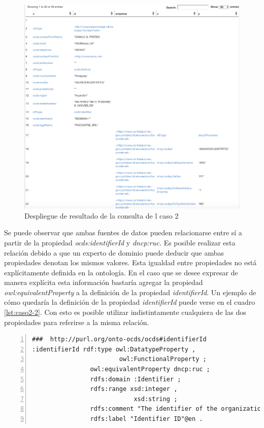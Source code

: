  \begin{figure}[ht!]
    \centering
    \includegraphics[width=150mm]{figuras/caso2Resultado.png}
    \caption{Despliegue de resultado de la consulta de l caso 2}
    \label{img:caso2Resultado}
 \end{figure}


 Se puede observar que ambas fuentes de datos pueden relacionarse entre sí a partir de la propiedad \textit{ocds:identifierId} y \textit{dncp:ruc.} Es posible realizar esta relación debido a que un experto de dominio puede deducir que ambas propiedades denotan los mismos valores. Esta igualdad entre propiedades no está explícitamente definida en la ontología. En el caso que se desee expresar de manera explícita esta información bastaría agregar la propiedad \textit{owl:equivalentProperty} a la definición de la propiedad \textit{identifierId}. Un ejemplo de cómo quedaría la definición de la propiedad \textit{identifierId} puede verse en el cuadro \ref{lst:caso2-2}. Con esto es posible utilizar indistintamente cualquiera de las dos propiedades para referirse a la misma relación.


 \begin{lstlisting}[captionpos=b, caption={Declaración de equivalencia semántica entre dncp:ruc y ocds:identifierID}, label=lst:caso2-2,  numbers=left,  numberstyle=\tiny\color{mygray},
    basicstyle=\tiny,frame=single]
###  http://purl.org/onto-ocds/ocds#identifierId
:identifierId rdf:type owl:DatatypeProperty ,
                        owl:FunctionalProperty ;
                owl:equivalentProperty dncp:ruc ;
                rdfs:domain :Identifier ;
                rdfs:range xsd:integer ,
                            xsd:string ;
                rdfs:comment "The identifier of the organization in the selected scheme."@en ;
                rdfs:label "Identifier ID"@en .
 \end{lstlisting}



